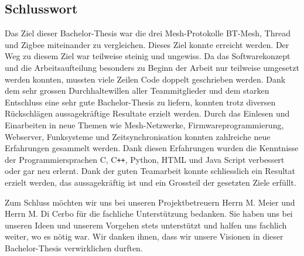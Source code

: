 \subsection{Schlusswort}\label{subsec:Schlusswort}
Das Ziel dieser Bachelor-Thesis war die drei Mesh-Protokolle BT-Mesh, Thread und Zigbee miteinander zu vergleichen.
Dieses Ziel konnte erreicht werden.
Der Weg zu diesem Ziel war teilweise steinig und ungewiss.
Da das Softwarekonzept und die Arbeitsaufteilung besonders zu Beginn der Arbeit nur teilweise umgesetzt werden konnten, mussten viele Zeilen Code doppelt geschrieben werden.
Dank dem sehr grossen Durchhaltewillen aller Teammitglieder und dem starken Entschluss eine sehr gute Bachelor-Thesis zu liefern, konnten trotz diversen Rückschlägen aussagekräftige Resultate erzielt werden.
Durch das Einlesen und Einarbeiten in neue Themen wie Mesh-Netzwerke, Firmwareprogrammierung, Webserver, Funksysteme und Zeitsynchronisation konnten zahlreiche neue Erfahrungen gesammelt werden. Dank diesen Erfahrungen wurden die Kenntnisse der Programmiersprachen C, C\texttt{++}, Python, HTML und Java Script verbessert oder gar neu erlernt.
Dank der guten Teamarbeit konnte schliesslich ein Resultat erzielt werden, das aussagekräftig ist und ein Grossteil der gesetzten Ziele erfüllt. 

Zum Schluss möchten wir uns bei unseren Projektbetreuern Herrn M. Meier und Herrn M. Di Cerbo für die fachliche Unterstützung bedanken.
Sie haben uns bei unseren Ideen und unserem Vorgehen stets unterstützt und halfen uns fachlich weiter, wo es nötig war. Wir danken ihnen, dass wir unsere Visionen in dieser Bachelor-Thesis verwirklichen durften.